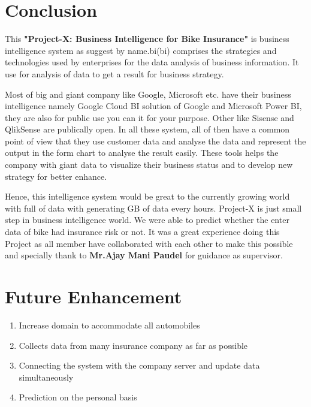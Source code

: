 \section{Conclusion}
\par
This \textbf{"Project-X: Business Intelligence for Bike Insurance"} is business intelligence system as suggest by name.\acl{bi}(\acs{bi}) comprises the strategies and technologies used by enterprises for the data analysis of business information. It use for analysis of data to get a result for business strategy.
\par Most of big and giant company like Google, Microsoft etc. have their business intelligence namely Google Cloud BI solution of Google and Microsoft Power BI, they are also for public use you can it for your purpose. Other like Sisense and QlikSense are publically open. In all these system, all of then have a common point of view that they use customer data and analyse the data and represent the output in the form chart to analyse the result easily. These tools helps the company with giant data to visualize their business status and to develop new strategy for better enhance.
\par 
Hence, this intelligence system would be great to the currently growing world with full of data with generating GB of data every hours. Project-X is just small step in  business intelligence world. We were able to predict whether the enter data of bike had insurance risk or not. It was a great experience doing this Project as all member have collaborated with each other to make this possible and specially thank to \textbf{Mr.Ajay Mani Paudel} for guidance as supervisor.

 \newpage
\section{Future Enhancement}
\begin{enumerate}
\item Increase domain to accommodate  all automobiles 
\item Collects data from many insurance company as far as possible
\item Connecting the system with the company server and update data simultaneously
\item Prediction on  the personal basis
\end{enumerate}

\newpage
\pagebreak
\renewcommand\bibname{References} %




